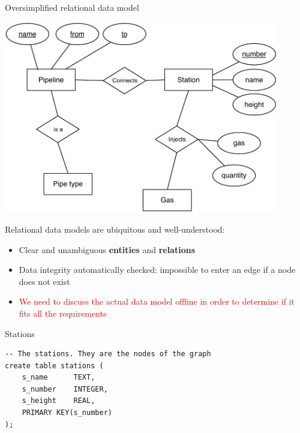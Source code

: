 \documentclass[10pt,aspectratio=169]{beamer}
\begin{document}
\begin{frame}{Oversimplified relational data model}
    \begin{minipage}{0.6\textwidth}
        \begin{center}
            \includegraphics[width=0.9\textwidth]{img/data_arch}
        \end{center}
    \end{minipage}
    \begin{minipage}{0.39\textwidth}
        Relational data models are ubiquitous and well-understood:
        \begin{itemize}
            \item Clear and unambiguous \textbf{entities} and \textbf{relations}
            \item Data integrity automatically checked: impossible to enter an edge if a node does not exist
            \item \textcolor{red}{We need to discuss the actual data model offline in order to determine if it fits all the requirements}
        \end{itemize}
    \end{minipage}
\end{frame}

\begin{frame}[fragile]{Stations}
\begin{verbatim}
-- The stations. They are the nodes of the graph
create table stations (
    s_name      TEXT,
    s_number    INTEGER,
    s_height    REAL,
    PRIMARY KEY(s_number)
);
\end{verbatim}
\end{frame}
\end{document}
